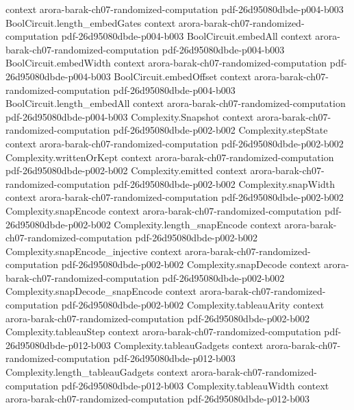 \begin{theorem}
  {context}
  {arora-barak-ch07-randomized-computation}
  {pdf-26d95080dbde-p004-b003}
\proofstep
  {BoolCircuit.length_embedGates}
  {context}
  {arora-barak-ch07-randomized-computation}
  {pdf-26d95080dbde-p004-b003}
\proofstep
  {BoolCircuit.embedAll}
  {context}
  {arora-barak-ch07-randomized-computation}
  {pdf-26d95080dbde-p004-b003}
\proofstep
  {BoolCircuit.embedWidth}
  {context}
  {arora-barak-ch07-randomized-computation}
  {pdf-26d95080dbde-p004-b003}
\proofstep
  {BoolCircuit.embedOffset}
  {context}
  {arora-barak-ch07-randomized-computation}
  {pdf-26d95080dbde-p004-b003}
\proofstep
  {BoolCircuit.length_embedAll}
  {context}
  {arora-barak-ch07-randomized-computation}
  {pdf-26d95080dbde-p004-b003}
\proofstep
  {Complexity.Snapshot}
  {context}
  {arora-barak-ch07-randomized-computation}
  {pdf-26d95080dbde-p002-b002}
\proofstep
  {Complexity.stepState}
  {context}
  {arora-barak-ch07-randomized-computation}
  {pdf-26d95080dbde-p002-b002}
\proofstep
  {Complexity.writtenOrKept}
  {context}
  {arora-barak-ch07-randomized-computation}
  {pdf-26d95080dbde-p002-b002}
\proofstep
  {Complexity.emitted}
  {context}
  {arora-barak-ch07-randomized-computation}
  {pdf-26d95080dbde-p002-b002}
\proofstep
  {Complexity.snapWidth}
  {context}
  {arora-barak-ch07-randomized-computation}
  {pdf-26d95080dbde-p002-b002}
\proofstep
  {Complexity.snapEncode}
  {context}
  {arora-barak-ch07-randomized-computation}
  {pdf-26d95080dbde-p002-b002}
\proofstep
  {Complexity.length_snapEncode}
  {context}
  {arora-barak-ch07-randomized-computation}
  {pdf-26d95080dbde-p002-b002}
\proofstep
  {Complexity.snapEncode_injective}
  {context}
  {arora-barak-ch07-randomized-computation}
  {pdf-26d95080dbde-p002-b002}
\proofstep
  {Complexity.snapDecode}
  {context}
  {arora-barak-ch07-randomized-computation}
  {pdf-26d95080dbde-p002-b002}
\proofstep
  {Complexity.snapDecode_snapEncode}
  {context}
  {arora-barak-ch07-randomized-computation}
  {pdf-26d95080dbde-p002-b002}
\proofstep
  {Complexity.tableauArity}
  {context}
  {arora-barak-ch07-randomized-computation}
  {pdf-26d95080dbde-p002-b002}
\proofstep
  {Complexity.tableauStep}
  {context}
  {arora-barak-ch07-randomized-computation}
  {pdf-26d95080dbde-p012-b003}
\proofstep
  {Complexity.tableauGadgets}
  {context}
  {arora-barak-ch07-randomized-computation}
  {pdf-26d95080dbde-p012-b003}
\proofstep
  {Complexity.length_tableauGadgets}
  {context}
  {arora-barak-ch07-randomized-computation}
  {pdf-26d95080dbde-p012-b003}
\proofstep
  {Complexity.tableauWidth}
  {context}
  {arora-barak-ch07-randomized-computation}
  {pdf-26d95080dbde-p012-b003}

\end{theorem}
